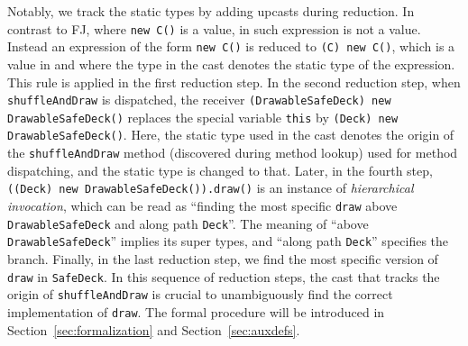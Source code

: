 Notably, we track the static types by adding upcasts during reduction. In contrast to FJ,
where \lstinline|new C()| is a value, in \MIM{} such expression is not 
a value. Instead an expression of the form \lstinline|new C()| is reduced to
\lstinline|(C) new C()|, which is a value in \MIM{} and where the type
in the cast denotes the static type of the expression. This rule is
applied in the first reduction step. 
In the second reduction step, when 
\lstinline|shuffleAndDraw| is dispatched, the receiver
\lstinline|(DrawableSafeDeck) new DrawableSafeDeck()|
replaces the special variable \lstinline|this| by 
\lstinline|(Deck) new DrawableSafeDeck()|. Here, the static type used
in the cast denotes the origin of the \lstinline|shuffleAndDraw|
method (discovered during method lookup) used
for method dispatching, and the static type is changed to that. 
Later, in the fourth step,
\lstinline|((Deck) new DrawableSafeDeck()).draw()|
is an instance of \textit{hierarchical invocation}, which can be read as 
``finding the most specific \lstinline|draw| above \lstinline|DrawableSafeDeck| and along path \lstinline|Deck|''. The meaning of ``above \lstinline|DrawableSafeDeck|'' implies its super types, and ``along path
\lstinline|Deck|'' specifies the branch. Finally, in the last
reduction step, we find the most
specific version of \lstinline|draw| in \lstinline|SafeDeck|. In this
sequence of
reduction steps, the cast that tracks the origin of
\lstinline|shuffleAndDraw| is crucial to unambiguously find the
correct implementation of \lstinline|draw|.
The formal procedure will be introduced in Section~\ref{sec:formalization} and Section~\ref{sec:auxdefs}.

